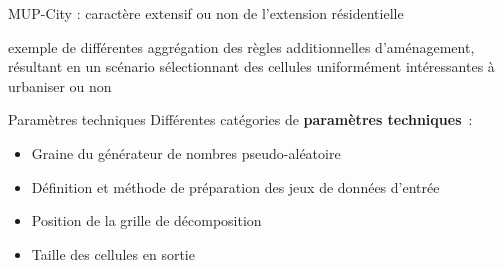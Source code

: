 \documentclass[xcolor=table]{beamer}
\begin{document}

\begin{frame}{MUP-City : caractère extensif ou non de l'extension résidentielle}
\vspace{1cm}

{\footnotesize exemple de différentes aggrégation des règles additionnelles d'aménagement, résultant en un scénario sélectionnant des cellules uniformément intéressantes à urbaniser ou non}
\end{frame}

\begin{frame}{Paramètres techniques}
	Différentes catégories de \textbf{paramètres techniques}~:\\
	\begin{itemize}
		\item Graine du générateur de nombres pseudo-aléatoire
		\item Définition et méthode de préparation des jeux de données d'entrée
		\item Position de la grille de décomposition
		\item Taille des cellules en sortie
	\end{itemize}
\end{frame}
\end{document}

